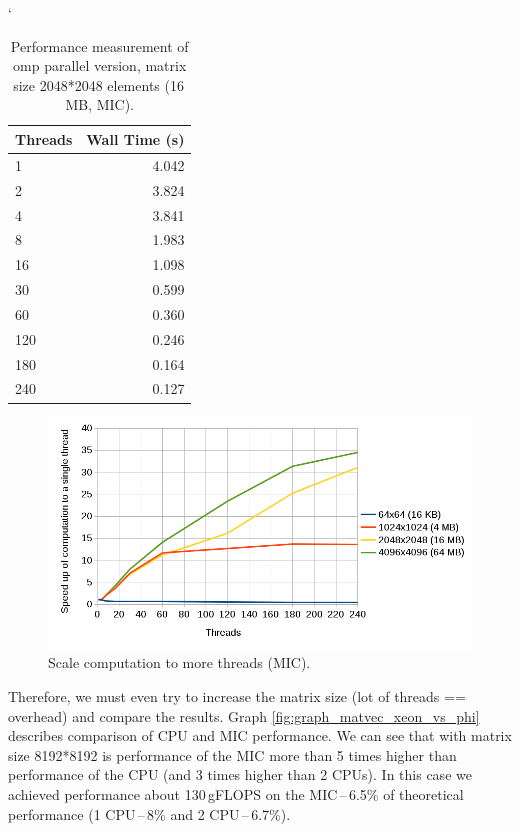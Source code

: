 \begin{table}[ht]
\catcode`
\begin{center}
\begin{tabular}{| l | r |} \hline
\textbf{Threads} & \textbf{Wall Time (s)}\\ \hline
1 & 4.042\\ \hline
2 & 3.824\\ \hline
4 & 3.841\\ \hline
8 & 1.983\\ \hline
16 & 1.098\\ \hline
30 & 0.599\\ \hline
60 & 0.360\\ \hline
120 & 0.246\\ \hline
180 & 0.164\\ \hline
240 & 0.127\\ \hline
\end{tabular}
\caption{Performance measurement of omp parallel version, matrix size 2048*2048 elements (16\,MB, MIC).}
\label{tab:table_matvec_2048_scaling_mic}
\end{center}
\end{table}

\begin{figure}[htbp]
    \centering
    \includegraphics[width=1\linewidth]{fig/matvec_scaling_mic.png}
    \caption{Scale computation to more threads (MIC).}
    \label{fig:graph_matvec_2048_scaling_mic}
\end{figure} 

\par Therefore, we must even try to increase the matrix size (lot of threads == overhead) and compare the results. Graph \ref{fig:graph_matvec_xeon_vs_phi} describes comparison of CPU and MIC performance. We can see that with matrix size 8192*8192 is performance of the MIC more than 5 times higher than performance of the CPU (and 3 times higher than 2 CPUs). In this case we achieved performance about 130\,gFLOPS on the MIC\,--\,6.5\% of theoretical performance (1 CPU\,--\,8\% and 2 CPU\,--\,6.7\%). 


